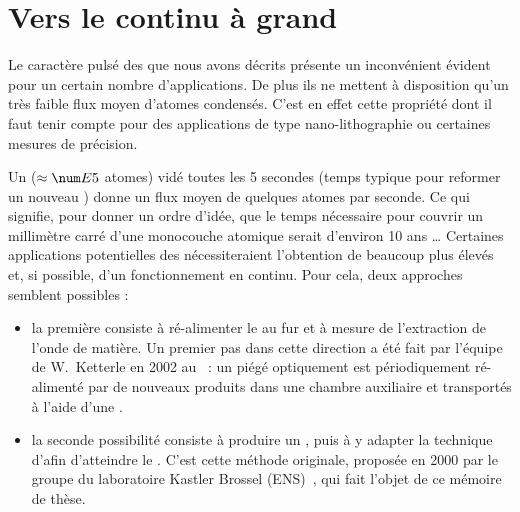 {\AjouteLigne}

\section{Vers le \lat continu à grand \fat}
Le caractère pulsé des \lats que nous avons décrits présente un inconvénient évident pour un certain nombre d'applications. De plus ils ne mettent à disposition qu'un très faible flux moyen d'atomes condensés. C'est en effet cette propriété dont il faut tenir compte pour des applications de type nano-lithographie ou certaines mesures de précision. 

\Remarque
{
Un \bec ($\approx \val{E5}$ atomes) vidé toutes les 5 secondes (temps typique pour reformer un nouveau \becc) donne un flux moyen de quelques  atomes par seconde. Ce qui signifie, pour donner un ordre d'idée, que le temps nécessaire pour couvrir un millimètre carré d'une monocouche atomique serait d'environ 10 ans \ldots
}
Certaines applications potentielles des \lats nécessiteraient l'obtention de \fats beaucoup plus élevés et, si possible, d'un fonctionnement en continu. 
Pour cela, deux approches semblent possibles :
\begin{itemize}
	\item la première consiste à ré-alimenter le \becc au fur et à mesure de l'extraction de l'onde de matière. Un premier pas dans cette direction a été fait par l'équipe de W.~Ketterle en 2002 au ~\cite{CSL02}: un \bec piégé optiquement est périodiquement ré-alimenté par de nouveaux \beccs produits dans une chambre auxiliaire et transportés à l'aide d'une .
	\item la seconde possibilité consiste à produire un \jatg, puis à y adapter la technique d'\evap afin d'atteindre le \rdq. C'est cette méthode originale, proposée en 2000 par le groupe  du laboratoire Kastler Brossel (ENS)~\cite{MMD00}, qui fait l'objet de ce mémoire de thèse.
\end{itemize}
%
